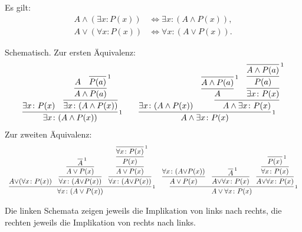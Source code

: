 \begin{Satz}%
\label{general-dl}
Es gilt:
\begin{align}
A\land (\exists x\colon P(x)) &\iff \exists x\colon (A\land P(x)),\\
A\lor (\forall x\colon P(x)) &\iff \forall x\colon (A\lor P(x)).
\end{align}
\end{Satz}
\begin{Beweis}
Schematisch. Zur ersten Äquivalenz:
\[\begin{array}{c@{\qquad}c}
\infer[\infernote{1}]{\exists x\colon (A\land P(x))}{
  \exists x\colon P(x)
& \infer{\exists x\colon (A\land P(x))}{
    \infer{A\land P(a)}{A & \infer[\infernote{1}]{P(a)}{}}}}
&
\infer[\infernote{1}]{A\land\exists x\colon P(x)}{
  \exists x\colon (A\land P(x))
& \infer{A\land \exists x\colon P(x)}{
    \infer{A}{\infer[\infernote{1}]{A\land P(a)}{}}
  & \infer{\exists x\colon P(x)}{
      \infer{P(a)}{\infer[\infernote{1}]{A\land P(a)}{}}}}}
\end{array}\]
Zur zweiten Äquivalenz:
{\small
\[\begin{array}{c@{\quad}c}
\infer[\infernote{1}]{\forall x\colon (A\lor P(x))}{
A{\lor}(\forall x\colon P(x))
& \infer{\forall x\colon (A{\lor}P(x))}{
    \infer{A\lor P(x)}{\infer[\infernote{1}]{A}{}}
  }
& \infer{\forall x\colon (A{\lor}P(x))}{
    \infer{A\lor P(x)}{
      \infer{P(x)}{\infer[\infernote{1}]{\forall x\colon P(x)}{}}
    }
  }
}
&
\infer[\infernote{1}]{A\lor\forall x\colon P(x)}{
  \infer{A\lor P(x)}{\forall x\colon (A{\lor}P(x))}
  & \infer{A{\lor}\forall x\colon P(x)}{
      \infer[\infernote{1}]{A}{}}
  & \infer{A{\lor}\forall x\colon P(x)}{
      \infer{\forall x\colon P(x)}{
        \infer[\infernote{1}]{P(x)}{}}}
}
\end{array}\]
}

\noindent
Die linken Schemata zeigen jeweils die Implikation von links nach
rechts, die rechten jeweils die Implikation von rechts nach
links.\,\qedsymbol
\end{Beweis}

